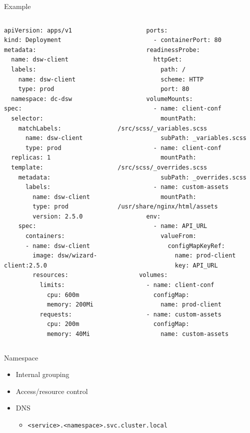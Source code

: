 \documentclass{dcpresentation}
\begin{document}
  \begin{frame}[fragile]{Example}
  \tiny
  \begin{columns}
\begin{verbatim}
apiVersion: apps/v1
kind: Deployment
metadata:
  name: dsw-client
  labels:
    name: dsw-client
    type: prod
  namespace: dc-dsw
spec:
  selector:
    matchLabels:
      name: dsw-client
      type: prod
  replicas: 1
  template:
    metadata:
      labels:
        name: dsw-client
        type: prod
        version: 2.5.0
    spec:
      containers:
      - name: dsw-client
        image: dsw/wizard-client:2.5.0
        resources:
          limits:
            cpu: 600m
            memory: 200Mi
          requests:
            cpu: 200m
            memory: 40Mi
    \end{verbatim}
  \begin{verbatim}
        ports:
          - containerPort: 80
        readinessProbe:
          httpGet:
            path: /
            scheme: HTTP
            port: 80
        volumeMounts:
          - name: client-conf
            mountPath: /src/scss/_variables.scss
            subPath: _variables.scss
          - name: client-conf
            mountPath: /src/scss/_overrides.scss
            subPath: _overrides.scss
          - name: custom-assets
            mountPath: /usr/share/nginx/html/assets
        env:
          - name: API_URL
            valueFrom:
              configMapKeyRef:
                name: prod-client
                key: API_URL
      volumes:
        - name: client-conf
          configMap:
            name: prod-client
        - name: custom-assets
          configMap:
            name: custom-assets

  \end{verbatim}
  \end{columns}
 \end{frame}
 
 \begin{frame}{Namespace}
  \begin{itemize}
   \item Internal grouping
   \item Access/resource control
   \item DNS
   \begin{itemize}
    \item \texttt{<service>.<namespace>.svc.cluster.local}
   \end{itemize}
  \end{itemize}
 \end{frame}
 
\end{document}
